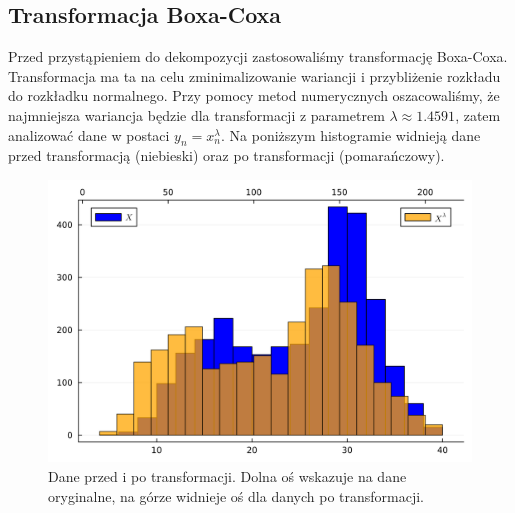 \documentclass[12pt]{article}
\theoremstyle{exer}
\begin{document}
	\subsection{Transformacja Boxa-Coxa}
	Przed przystąpieniem do dekompozycji zastosowaliśmy transformację Boxa-Coxa. Transformacja ma ta na celu zminimalizowanie wariancji i przybliżenie rozkładu do rozkładku normalnego. Przy pomocy metod numerycznych oszacowaliśmy, że najmniejsza wariancja będzie dla transformacji z parametrem $\lambda\approx1.4591$, zatem analizować dane w postaci $y_n=x_n^\lambda$. Na poniższym histogramie widnieją dane przed transformacją (niebieski) oraz po transformacji (pomarańczowy).
	\begin{figure}[H]
		\includegraphics[width=\columnwidth]{Budnik/img/BoxCox.png}
		\caption{Dane przed i po transformacji. Dolna oś wskazuje na dane oryginalne, na górze widnieje oś dla danych po transformacji.}
	\end{figure}
\end{document}
